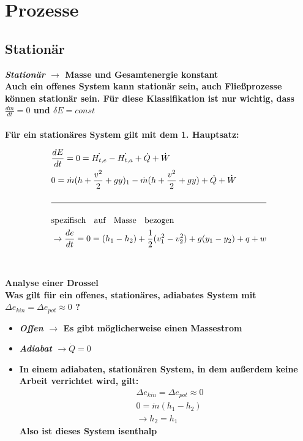 \documentclass[12pt]{article}
\begin{document}
\section{Prozesse}

\subsection{Stationär}
\textbf{\textit{Stationär} $\rightarrow$ Masse und Gesamtenergie konstant \\
Auch ein offenes System kann stationär sein, auch Fließprozesse können stationär sein. Für diese Klassifikation ist nur wichtig, dass $\frac{dm}{dt}=0$ und $\delta E=const$ \\ \\
Für ein stationäres System gilt mit dem 1. Hauptsatz:}

\begin{align*}
&\frac{dE}{dt}=0=\dot{H_{t,e}}-\dot{H_{t,a}}+\dot{Q}+\dot{W} \\
&0 = \dot{m}(h+\frac{v^2}{2}+gy)_1-\dot{m}(h+\frac{v^2}{2}+gy)+\dot{Q}+\dot{W} \\ \\
\hline \\
&\text{spezifisch \; auf \; Masse \; bezogen}\\  &\rightarrow \frac{de}{dt}=0=(h_1-h_2)+\frac{1}{2}(v_1^2-v_2^2)+g(y_1-y_2)+q+w
\end{align*}
\\\\
\textbf{Analyse einer Drossel\\
Was gilt für ein offenes, stationäres, adiabates System mit $\Delta e_{kin}=\Delta e_{pot} \approx 0$ ? }
\begin{itemize}
\item \textbf{ \textit{Offen} $\rightarrow$ Es gibt möglicherweise einen Massestrom}
\item \textbf{ \textit{Adiabat} $\rightarrow \dot{Q}=0$}
\item \textbf{In einem adiabaten, stationären System, in dem außerdem keine Arbeit verrichtet wird, gilt:}\begin{align*}
&\Delta e_{kin}=\Delta e_{pot} \approx 0 \\
&0=\dot{m}(h_1-h_2) \\
&\rightarrow h_2=h_1
\end{align*}
\textbf{Also ist dieses System isenthalp}

\end{itemize}
\end{document}
